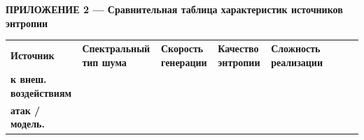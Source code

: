 
\clearpage
\begin{landscape}
\singlespacing
\begin{center}\small\bfseries
ПРИЛОЖЕНИЕ 2 --- Сравнительная таблица характеристик источников энтропии
\end{center}
\nopagebreak\vspace{0.15\baselineskip}\nopagebreak
\centering
{\scriptsize\setlength{\tabcolsep}{2.6pt}\renewcommand{\arraystretch}{0.9}%
{\def\LTcaptype{none}%
\begin{longtable}[]{@{}|%
  >{\raggedright\arraybackslash}p{}|%
  >{\raggedright\arraybackslash}p{}|%
  >{\raggedright\arraybackslash}p{}|%
  >{\raggedright\arraybackslash}p{}|%
  >{\raggedright\arraybackslash}p{}|%
  >{\raggedright\arraybackslash}p{}|%
  >{\raggedright\arraybackslash}p{}|%
  >{\raggedright\arraybackslash}p{}|@{}}
\hline
\begin{minipage}[b]{\hsize}\raggedright
\textbf{Источник}
\end{minipage} & \begin{minipage}[b]{\hsize}\raggedright
\textbf{Спектральный тип шума}
\end{minipage} & \begin{minipage}[b]{\hsize}\raggedright
\textbf{Скорость генерации}
\end{minipage} & \begin{minipage}[b]{\hsize}\raggedright
\textbf{Качество энтропии}
\end{minipage} & \begin{minipage}[b]{\hsize}\raggedright
\textbf{Сложность реализации}
\end{minipage} & \begin{minipage}[b]{\hsize}\raggedright\textbf{Устойчивость}\\\textbf{к внеш.\,воздействиям}%
\end{minipage} & \begin{minipage}[b]{\hsize}\raggedright\textbf{Защита от}\\\textbf{атак / модель.}%

\end{minipage}
\end{longtable}}}
\end{landscape}
